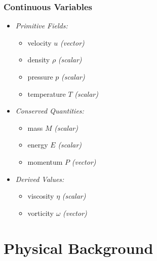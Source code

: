 	\begin{frame}
		\frametitle{Continuous Variables}
		\begin{itemize}
			\item<2-> \itshape{Primitive Fields:}
			\setlength{\multicolsep}{1pt}
			\setlength{\columnsep}{-25ex}
			\begin{multicols}{2}
				\begin{itemize}
					\item<3-> velocity $u$ \itshape{(vector)}
					\item<5-> density $\rho$ \itshape{(scalar)}
					\item<4-> pressure $p$ \itshape{(scalar)}
					\item<6-> temperature $T$ \itshape{(scalar)}
				\end{itemize}
			\end{multicols}
			\vspace{1ex}
			\item<7-> \itshape{Conserved Quantities:}
			\setlength{\multicolsep}{1pt}
			\setlength{\columnsep}{-25ex}
			\begin{multicols}{2}
				\begin{itemize}
					\item<8-> mass $M$ \itshape{(scalar)}
					\item<10-> energy $E$ \itshape{(scalar)}
					\item<9-> momentum $P$ \itshape{(vector)}
				\end{itemize}
			\end{multicols}
			\vspace{1ex}
			\item<11-> \itshape{Derived Values:}
			\setlength{\multicolsep}{1pt}
			\setlength{\columnsep}{-25ex}
			\begin{multicols}{2}
				\begin{itemize}
					\item<12-> viscosity $\eta$ \itshape{(scalar)}
					\item<13-> vorticity $\omega$ \itshape{(vector)}
				\end{itemize}
			\end{multicols}
		\end{itemize}
	\end{frame}

	\section{Physical Background}

